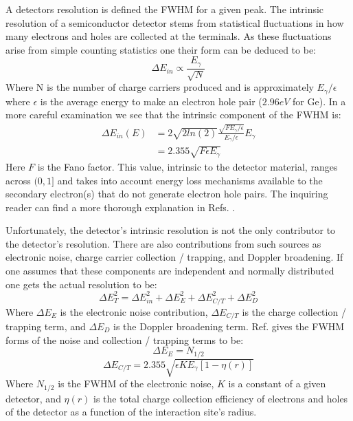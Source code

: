 A detectors resolution is defined the FWHM for a given peak. The intrinsic resolution of a semiconductor detector stems from statistical fluctuations in how many electrons and holes are collected at the terminals. As these fluctuations arise from simple counting statistics one their form can be deduced to be:
\begin{equation}
\label{eqn:hpge-res-est} 
\Delta{}E_{in} \propto \frac{E_{\gamma}}{\sqrt{N}}
\end{equation}
Where N is the number of charge carriers produced and is approximately $E_{\gamma}/\epsilon$ where $\epsilon$ is the average energy to make an electron hole pair ($2.96eV$ for Ge). In a more careful examination we see that the intrinsic component of the FWHM is:
\begin{equation}
\label{eqn:hpge-in-res} 
\begin{split}
\Delta{}E_{in}(E) & = 2\sqrt{2 ln(2)}\frac{\sqrt{F E_{\gamma{}}/\epsilon{}}}{E_{\gamma{}}/\epsilon{}}E_{\gamma{}}\\
       & = 2.355\sqrt{F\epsilon{}E_{\gamma{}}}
\end{split}
\end{equation}
Here $F$ is the Fano factor. This value, intrinsic to the detector material, ranges across $(0,1]$ and takes into account energy loss mechanisms available to the secondary electron(s) that do not generate electron hole pairs. The inquiring reader can find a more thorough explanation in Refs. \cite{knollBook,fano_factor1}.

Unfortunately, the detector's intrinsic resolution is not the only contributor to the detector's resolution. There are also contributions from such sources as electronic noise, charge carrier collection / trapping, and Doppler broadening. If one assumes that these components are independent and normally distributed one gets the actual resolution to be:
\begin{equation}
\label{eqn:hpge-res} 
\Delta{}E_{T}^2 = \Delta{}E_{in}^2 + \Delta{}E_{E}^2 + \Delta{}E_{C/T}^2 + \Delta{}E_{D}^2
\end{equation}
Where $\Delta{}E_{E}$ is the electronic noise contribution, $\Delta{}E_{C/T}$ is the charge collection / trapping term, and $\Delta{}E_{D}$ is the Doppler broadening term. Ref. \cite{trappingResolution} gives the FWHM forms of the noise and collection / trapping terms to be:
\begin{equation}
\label{eqn:hpge-res-noise} 
\Delta{}E_{E} = N_{1/2}
\end{equation}
\begin{equation}
\label{eqn:hpge-res-ct} 
\Delta{}E_{C/T} = 2.355\sqrt{\epsilon{} K E_{\gamma{}} [1-\eta{}(r)]}
\end{equation}
Where $N_{1/2}$ is the FWHM of the electronic noise, $K$ is a constant of a given detector, and $\eta{}(r)$ is the total charge collection efficiency of electrons and holes of the detector as a function of the interaction site's radius.


